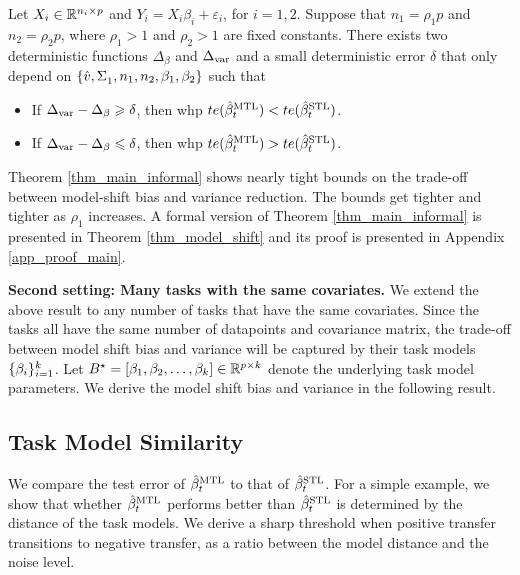 \begin{theorem}[Informal]\label{thm_main_informal}
	Let $X_i \in\mathbb{R}^{n_i \times p}$ and $Y_i = X_i\beta_i + \varepsilon_i$, for $i = 1, 2$.
	Suppose that $n_1 = \rho_1 p$ and $n_2 = \rho_2 p$, where $\rho_1>1$ and $\rho_2 >1$ are fixed constants.
	There exists two deterministic functions $\Delta_{\beta}$ and $\Delta_{\text{var}}$ and a small deterministic error $\delta$ that only depend on $\{\hat{v}, \Sigma_1^{}, n_1, n_2, \beta_1, \beta_2\}$ such that
	\begin{itemize}
		\item If $\Delta_{\text{var}} - \Delta_{\beta} \geqslant \delta$, then whp $te(\hat{\beta}_t^{\text{MTL}}) < te(\hat{\beta}_t^{\text{STL}})$.
		\item If $\Delta_{\text{var}} - \Delta_{\beta} \leqslant \delta$, then whp $te(\hat{\beta}_t^{\text{MTL}}) > te(\hat{\beta}_t^{\text{STL}})$.
	\end{itemize}
\end{theorem}

Theorem \ref{thm_main_informal} shows nearly tight bounds on the trade-off between model-shift bias and variance reduction.
The bounds get tighter and tighter as $\rho_1$ increases.
A formal version of Theorem \ref{thm_main_informal} is presented in Theorem \ref{thm_model_shift} and its proof is presented in Appendix \ref{app_proof_main}.


\textbf{Second setting: Many tasks with the same covariates.}
We extend the above result to any number of tasks that have the same covariates.
Since the tasks all have the same number of datapoints and covariance matrix, the trade-off between model shift bias and variance will be captured by their task models $\{\beta_i\}_{i=1}^k$.
Let $B^{\star} = [\beta_1, \beta_2, \dots, \beta_k] \in\mathbb{R}^{p\times k}$ denote the underlying task model parameters.
We derive the model shift bias and variance in the following result.



\subsection{Task Model Similarity}\label{sec_similarity}

We compare the test error of $\hat{\beta}_t^{\text{MTL}}$ to that of $\hat{\beta}_t^{\text{STL}}$.
For a simple example, we show that whether $\hat{\beta}_t^{\text{MTL}}$ performs better than $\hat{\beta}_t^{\text{STL}}$ is determined by the distance of the task models.
We derive a sharp threshold when positive transfer transitions to negative transfer, as a ratio between the model distance and the noise level.

